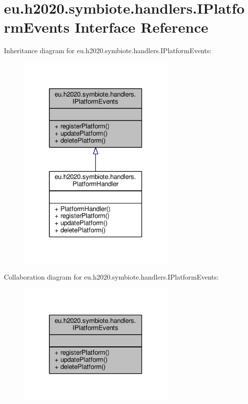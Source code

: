 \hypertarget{interfaceeu_1_1h2020_1_1symbiote_1_1handlers_1_1IPlatformEvents}{}\section{eu.\+h2020.\+symbiote.\+handlers.\+I\+Platform\+Events Interface Reference}
\label{interfaceeu_1_1h2020_1_1symbiote_1_1handlers_1_1IPlatformEvents}


Inheritance diagram for eu.\+h2020.\+symbiote.\+handlers.\+I\+Platform\+Events\+:
\nopagebreak
\begin{figure}[H]
\begin{center}
\leavevmode
\includegraphics[width=222pt]{interfaceeu_1_1h2020_1_1symbiote_1_1handlers_1_1IPlatformEvents__inherit__graph}
\end{center}
\end{figure}


Collaboration diagram for eu.\+h2020.\+symbiote.\+handlers.\+I\+Platform\+Events\+:
\nopagebreak
\begin{figure}[H]
\begin{center}
\leavevmode
\includegraphics[width=222pt]{interfaceeu_1_1h2020_1_1symbiote_1_1handlers_1_1IPlatformEvents__coll__graph}
\end{center}
\end{figure}
